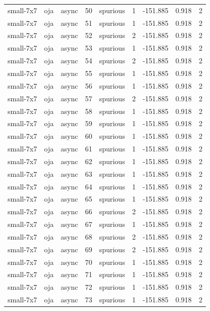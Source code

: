\begin{tabular}{lllrlrrrr}
small-7x7 & oja & async & 50 & spurious & 1 & -151.885 & 0.918 & 2 \\
small-7x7 & oja & async & 51 & spurious & 1 & -151.885 & 0.918 & 2 \\
small-7x7 & oja & async & 52 & spurious & 2 & -151.885 & 0.918 & 2 \\
small-7x7 & oja & async & 53 & spurious & 1 & -151.885 & 0.918 & 2 \\
small-7x7 & oja & async & 54 & spurious & 2 & -151.885 & 0.918 & 2 \\
small-7x7 & oja & async & 55 & spurious & 1 & -151.885 & 0.918 & 2 \\
small-7x7 & oja & async & 56 & spurious & 1 & -151.885 & 0.918 & 2 \\
small-7x7 & oja & async & 57 & spurious & 2 & -151.885 & 0.918 & 2 \\
small-7x7 & oja & async & 58 & spurious & 1 & -151.885 & 0.918 & 2 \\
small-7x7 & oja & async & 59 & spurious & 1 & -151.885 & 0.918 & 2 \\
small-7x7 & oja & async & 60 & spurious & 1 & -151.885 & 0.918 & 2 \\
small-7x7 & oja & async & 61 & spurious & 1 & -151.885 & 0.918 & 2 \\
small-7x7 & oja & async & 62 & spurious & 1 & -151.885 & 0.918 & 2 \\
small-7x7 & oja & async & 63 & spurious & 1 & -151.885 & 0.918 & 2 \\
small-7x7 & oja & async & 64 & spurious & 1 & -151.885 & 0.918 & 2 \\
small-7x7 & oja & async & 65 & spurious & 1 & -151.885 & 0.918 & 2 \\
small-7x7 & oja & async & 66 & spurious & 2 & -151.885 & 0.918 & 2 \\
small-7x7 & oja & async & 67 & spurious & 1 & -151.885 & 0.918 & 2 \\
small-7x7 & oja & async & 68 & spurious & 2 & -151.885 & 0.918 & 2 \\
small-7x7 & oja & async & 69 & spurious & 2 & -151.885 & 0.918 & 2 \\
small-7x7 & oja & async & 70 & spurious & 1 & -151.885 & 0.918 & 2 \\
small-7x7 & oja & async & 71 & spurious & 1 & -151.885 & 0.918 & 2 \\
small-7x7 & oja & async & 72 & spurious & 1 & -151.885 & 0.918 & 2 \\
small-7x7 & oja & async & 73 & spurious & 1 & -151.885 & 0.918 & 2 \\

\end{tabular}
